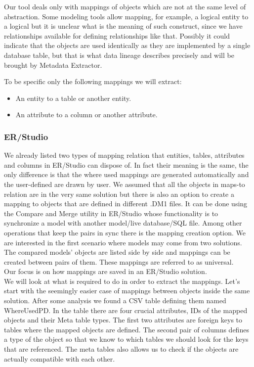Our tool deals only with mappings of objects which are not at the same level of abstraction. 
Some modeling tools allow mapping, for example, a logical entity to a logical but it is unclear what is the meaning of such construct, since we have relationships available for defining relationships like that. Possibly it could indicate that the objects are used identically as they are implemented by a single database table, but that is what data lineage describes precisely and will be brought by Metadata Extractor.

To be specific only the following mappings we will extract: 
\begin{itemize}
	\item An entity to a table or another entity. 
	\item An attribute to a column or another attribute.
\end{itemize}

\subsubsection{ER/Studio}

We already listed two types of mapping relation that entities, tables, attributes and columns in ER/Studio can dispose of. 
In fact their meaning is the same, the only difference is that the where used mappings are generated automatically and the user-defined are drawn by user. We assumed that all the objects in maps-to relation are in the very same solution but there is also an option to create a mapping to objects that are defined in different .DM1 files. It can be done using the Compare and Merge utility in ER/Studio whose functionality is to synchronize a model with another model/live database/SQL file. Among other operations that keep the pairs in sync there is the mapping creation option. We are interested in the first scenario where models may come from two solutions. The compared models' objects are listed side by side and mappings can be created between pairs of them. These mappings are referred to as universal. \\

Our focus is on how mappings are saved in an ER/Studio solution. \\ 

We will look at what is required to do in order to extract the mappings.
Let's start with the seemingly easier case of mappings between objects inside the same solution. After some analysis we found a CSV table defining them named Where\textunderscore Used\textunderscore PD.
In the table there are four crucial attributes, IDs of the mapped objects and their Meta table types.
The first two attributes are foreign keys to tables where the mapped objects are defined. The second pair of columns defines a type of the object so that we know to which tables we should look for the keys that are referenced. The meta tables also allows us to check if the objects are actually compatible with each other. \\

